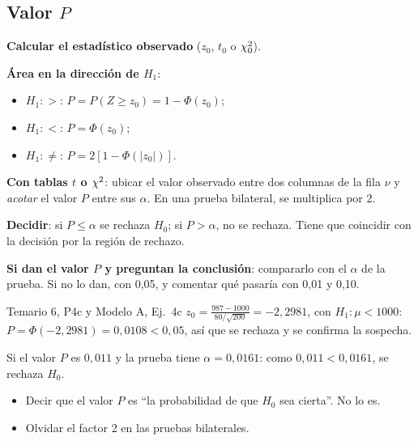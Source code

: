 \subsection{Valor $P$}\label{p:valorp}
\begin{pasos}
\begin{pasolista}
\item \textbf{Calcular el estadístico observado} ($z_0$, $t_0$ o $\chi^2_0$).
\item \textbf{Área en la dirección de $H_1$}:
\begin{itemize}
\item $H_1:>$: $P=P(Z\ge z_0)=1-\Phi(z_0)$;
\item $H_1:<$: $P=\Phi(z_0)$;
\item $H_1:\neq$: $P=2[1-\Phi(|z_0|)]$.
\end{itemize}
\item \textbf{Con tablas $t$ o $\chi^2$}: ubicar el valor observado entre dos columnas de la fila $\nu$ y \emph{acotar} el valor $P$ entre sus $\alpha$. En una prueba bilateral, se multiplica por 2.
\item \textbf{Decidir}: si $P\le\alpha$ se rechaza $H_0$; si $P>\alpha$, no se rechaza. Tiene que coincidir con la decisión por la región de rechazo.
\item \textbf{Si dan el valor $P$ y preguntan la conclusión}: compararlo con el $\alpha$ de la prueba. Si no lo dan, con 0,05, y comentar qué pasaría con 0,01 y 0,10.
\end{pasolista}
\end{pasos}
\begin{modelo}{Temario 6, P4c y Modelo A, Ej.\ 4c}
$z_0=\frac{987-1000}{80/\sqrt{200}}=-2{,}2981$, con $H_1:\mu<1000$: $P=\Phi(-2{,}2981)=0{,}0108<0{,}05$, así que se rechaza y se confirma la sospecha.

Si el valor $P$ es $0{,}011$ y la prueba tiene $\alpha=0{,}0161$: como $0{,}011<0{,}0161$, se rechaza $H_0$.
\end{modelo}
\begin{ojo}
\begin{itemize}
\item Decir que el valor $P$ es ``la probabilidad de que $H_0$ sea cierta''. No lo es.
\item Olvidar el factor 2 en las pruebas bilaterales.
\end{itemize}
\end{ojo}

